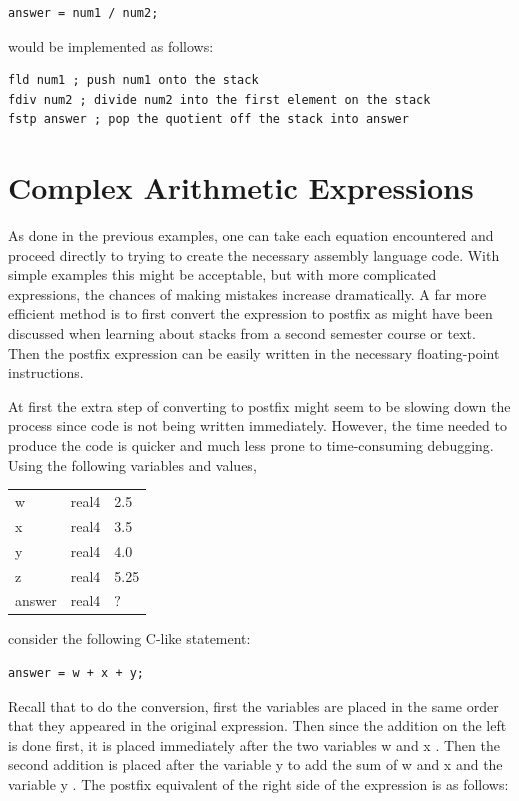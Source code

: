 \documentclass[10pt]{book}
\begin{document}
\begin{verbatim}
answer = num1 / num2;
\end{verbatim}

would be implemented as follows:

\begin{verbatim}
fld num1 ; push num1 onto the stack
fdiv num2 ; divide num2 into the first element on the stack
fstp answer ; pop the quotient off the stack into answer
\end{verbatim}

\section{Complex Arithmetic Expressions}
As done in the previous examples, one can take each equation encountered and proceed directly to trying to create the necessary assembly language code. With simple examples this might be acceptable, but with more complicated expressions, the chances of making mistakes increase dramatically. A far more efficient method is to first convert the expression to postfix as might have been discussed when learning about stacks from a second semester course or text. Then the postfix expression can be easily written in the necessary floating-point instructions.

At first the extra step of converting to postfix might seem to be slowing down the process since code is not being written immediately. However, the time needed to produce the code is quicker and much less prone to time-consuming debugging. Using the following variables and values,

\begin{center}
\begin{tabular}{lll}
w & real4 & 2.5 \\
x & real4 & 3.5 \\
y & real4 & 4.0 \\
z & real4 & 5.25 \\
answer & real4 & $?$ \\
\end{tabular}
\end{center}

consider the following C-like statement:

\begin{verbatim}
answer = w + x + y;
\end{verbatim}

Recall that to do the conversion, first the variables are placed in the same order that they appeared in the original expression. Then since the addition on the left is done first, it is placed immediately after the two variables w and x . Then the second addition is placed after the variable y to add the sum of w and x and the variable y . The postfix equivalent of the right side of the expression is as follows:
\end{document}
